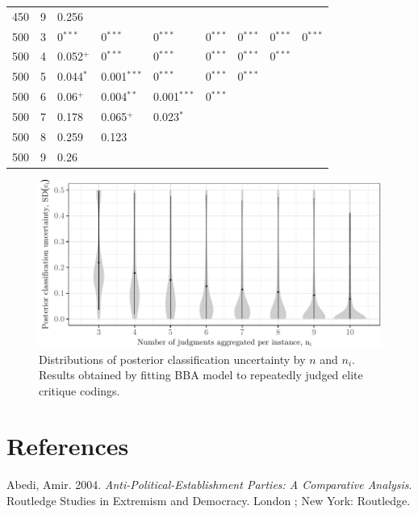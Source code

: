 \documentclass[12pt,]{article}
\begin{document}
\begin{longtable}{rrlllllll}
450 & 9 & 0.256 &  &  &  &  &  & \\
500 & 3 & 0$^{***}$ & 0$^{***}$ & 0$^{***}$ & 0$^{***}$ & 0$^{***}$ & 0$^{***}$ & 0$^{***}$\\
500 & 4 & 0.052$^+$ & 0$^{***}$ & 0$^{***}$ & 0$^{***}$ & 0$^{***}$ & 0$^{***}$ & \\
500 & 5 & 0.044$^*$ & 0.001$^{***}$ & 0$^{***}$ & 0$^{***}$ & 0$^{***}$ &  & \\
500 & 6 & 0.06$^+$ & 0.004$^{**}$ & 0.001$^{***}$ & 0$^{***}$ &  &  & \\
500 & 7 & 0.178 & 0.065$^+$ & 0.023$^*$ &  &  &  & \\
500 & 8 & 0.259 & 0.123 &  &  &  &  & \\
500 & 9 & 0.26 &  &  &  &  &  & \\*
\end{longtable}

\begin{figure}[H]

{\centering \includegraphics{licht_2019_evaluating_crowdsourced_elite_critique_codings_files/figure-latex/sim_test_distributions_apx-1} 

}

\caption{Distributions of posterior classification uncertainty by $n$ and $n_i$. Results obtained by fitting BBA model to repeatedly judged elite critique codings.}\label{fig:sim_test_distributions_apx}
\end{figure}

\hypertarget{references}{%
\section*{References}\label{references}}

\hypertarget{refs}{}
\leavevmode\hypertarget{ref-abedi_anti-political-establishment_2004}{}%
Abedi, Amir. 2004. \emph{Anti-Political-Establishment Parties: A
Comparative Analysis}. Routledge Studies in Extremism and Democracy.
London ; New York: Routledge.
\end{document}
